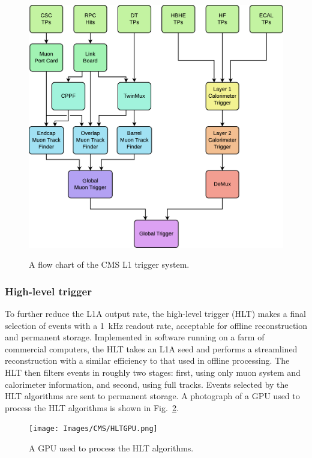 \begin{figure}[H]
    \centering
    {\includegraphics[width=\textwidth]{Images/CMS/L1TriggerMap.png}}
    \caption{A flow chart of the CMS L1 trigger system.}
    \label{fig:L1TriggerMap}
\end{figure}

\subsubsection{High-level trigger} \label{sec:HLT}
To further reduce the L1A output rate, the high-level trigger (HLT) makes a final selection of events with a \SI{1}{kHz} readout rate, acceptable for offline reconstruction and permanent storage. Implemented in software running on a farm of commercial computers, the HLT takes an L1A seed and performs a streamlined reconstruction with a similar efficiency to that used in offline processing. The HLT then filters events in roughly two stages: first, using only muon system and calorimeter information, and second, using full tracks. Events selected by the HLT algorithms are sent to permanent storage. A photograph of a GPU used to process the HLT algorithms is shown in Fig.~\ref{fig:HLTGPU}.

\begin{figure}[H]
    \centering
    {\texttt{[image: Images/CMS/HLTGPU.png]}}
    \caption{A GPU used to process the HLT algorithms.}
    \label{fig:HLTGPU}
\end{figure}